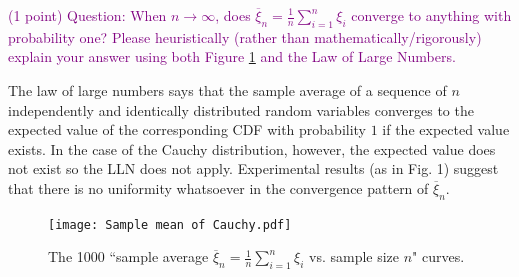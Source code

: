 \documentclass[11pt,letterpaper, leqno]{article}
\numberwithin{equation}{section}
\numberwithin{theorem}{section}
\numberwithin{lemma}{section}
\numberwithin{corollary}{section}
\numberwithin{definition}{section}
\numberwithin{proposition}{section}
\numberwithin{remark}{section}
\numberwithin{example}{section}
\begin{document}
\begin{enumerate}[a]
\textcolor{purple}{(1 point) Question: When $n\rightarrow\infty$, does $\overline{\xi}_n=\frac{1}{n}\sum_{i=1}^n \xi_i$ converge to anything with probability one? Please heuristically (rather than mathematically/rigorously) explain your answer using both Figure \ref{fig: Sample mean of Cauchy} and the Law of Large Numbers.}

\color{blue}
    The law of large numbers says that the sample average of a sequence of $n$ independently and identically distributed random variables converges to the expected value of the corresponding CDF with probability $1$ if the expected value exists. In the case of the Cauchy distribution, however, the expected value does not exist so the LLN does not apply. Experimental results (as in Fig. 1) suggest that there is no uniformity whatsoever in the convergence pattern of $\overline \xi_n$.
\color{black}
\pagebreak

\end{enumerate}



\begin{figure}[h]
    \centering
    \texttt{[image: Sample mean of Cauchy.pdf]}
    \caption{The 1000 ``sample average $\overline{\xi}_n=\frac{1}{n}\sum_{i=1}^n \xi_i$ vs. sample size $n$" curves.}
    \label{fig: Sample mean of Cauchy}
\end{figure}


%

\end{document}

